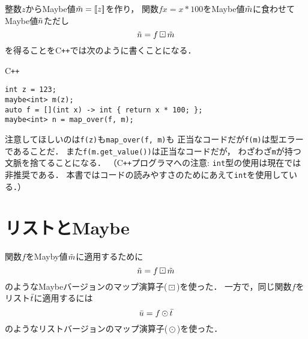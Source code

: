 \documentclass[a5paper,draft]{jsbook}
\def\[{\left[\!\left[}
\def\]{\right]\!\right]}
\newcommand{\programminglanguage}[1]{\textsf{#1}}
\newcommand{\cxx}{\programminglanguage{C}\texttt{++}}
\newcommand{\code}[1]{\texttt{#1}}
\newenvironment{cxxcode}{\begin{itembox}[r]{\cxx}}{\end{itembox}}
\newcommand{\mathMaybeWith}[1]{\[#1\]}
\newcommand{\mathListVar}[1]{\Bar{#1}}
\newcommand{\mathMaybeVar}[1]{\Tilde{#1}}
\newcommand{\mathBinaryOperator}[1]{\operatorname{#1}}
\newcommand{\mathMap}{\mathBinaryOperator{\odot}}
\newcommand{\mathMaybeMap}{\mathBinaryOperator{\boxdot}}
\begin{document}
整数$z$からMaybe値$\mathMaybeVar{m}=\mathMaybeWith{z}$を作り，
関数$fx=x*100$をMaybe値$\mathMaybeVar{m}$に食わせて
Maybe値$\mathMaybeVar{n}$ただし
$$
\mathMaybeVar{n}=f\mathMaybeMap\mathMaybeVar{m}
$$
を得ることを\cxx では次のように書くことになる．
\begin{cxxcode}
\begin{verbatim}
int z = 123;
maybe<int> m(z);
auto f = [](int x) -> int { return x * 100; };
maybe<int> n = map_over(f, m);
\end{verbatim}
\end{cxxcode}
注意してほしいのは\code{f(z)}も\code{map\_over(f, m)}も
正当なコードだが\code{f(m)}は型エラーであることだ．
また\code{f(m.get\_value())}は正当なコードだが，
わざわざ\code{m}が持つ文脈を捨てることになる．
（\cxx プログラマへの注意: \code{int}型の使用は現在では非推奨である．
本書ではコードの読みやすさのためにあえて\code{int}を使用している．）


\section{リストとMaybe}

関数$f$をMayby値$\mathMaybeVar{m}$に適用するために
$$
\mathMaybeVar{n}=f\mathMaybeMap\mathMaybeVar{m}
$$
のようなMaybeバージョンのマップ演算子($\mathMaybeMap$)を使った．
一方で，同じ関数$f$をリスト$\mathListVar{t}$に適用するには
$$
\mathListVar{u}=f\mathMap\mathListVar{t}
$$
のようなリストバージョンのマップ演算子($\mathMap$)を使った．
\end{document}
